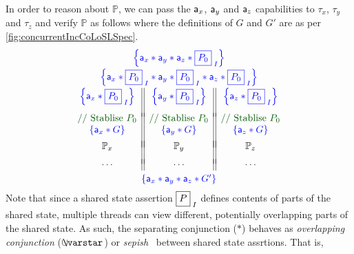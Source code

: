 In order to reason about $\mathbb{P}$, we can pass the $\mathsf{a}_x$, $\mathsf{a}_y$ and $\mathsf{a}_z$ capabilities to $\tau_x$, $\tau_y$ and $\tau_z$ and verify $\mathbb{P}$ as follows where the definitions of $G$ and $G'$ are as per \fig\ref{fig:concurrentIncCoLoSLSpec}.
%
\[
\begin{array}{c}
	\color{blue}{\left\{\token a_x * \token a_y *  \token a_z *  \shared{P_0}{I} \right\}}\vspace*{2pt}\\
	
	\color{blue}{\left\{\token a_x * \shared{P_0}{I} * \token a_y *  \shared{P_0}{I} * \token a_z *  \shared{P_0}{I} \right\}}\vspace*{2pt}\\
	
	\begin{array}{c || c || c}
		\color{blue}{\left\{\token a_x * \shared{P_0}{I} \right\}} & \color{blue}{\left\{\token a_y * \shared{P_0}{I} \right\}} & \color{blue}{\left\{\token a_z * \shared{P_0}{I} \right\}}\\
		
		&&\vspace*{-4pt}\\
		
		\color{darkgreen}{\text{// Stablise } P_0} & \color{darkgreen}{\text{// Stablise } P_0} & \color{darkgreen}{\text{// Stablise } P_0}\\
		
		\color{blue}{\left\{\token a_x * G \right\}} & \color{blue}{\left\{\token a_y * G \right\}} & \color{blue}{\left\{\token a_z * G \right\}}\\
		&&\vspace*{-7pt}\\
		\mathbb{P}_x & \mathbb{P}_y & \mathbb{P}_z\\
		&&\vspace*{-5pt}\\
		\cdots & \cdots & \cdots
	\end{array}\vspace*{3pt}\\
	
	\color{blue}{\left\{\token a_x * \token a_y *  \token a_z *  G' \right\}}\\
\end{array}
\]
%
Note that since a shared state assertion $\shared{P}{I}$ defines contents of parts of the shared state, multiple threads can view different, potentially overlapping parts of the shared state. As such, the separating conjunction ($*$) behaves as \emph{overlapping conjunction} ($\sepish$) or \emph{sepish}~\cite{todo} between shared state assrtions. That is,
